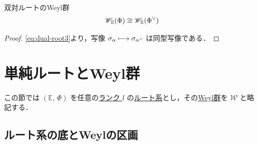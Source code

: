 \documentclass[rep_main]{subfiles}
\begin{document}
\begin{mylem}[label=lem:Weylgroup-dual]{双対ルートのWeyl群}
	\begin{align}
		\mathscr{W}_{\mathbb{E}}(\Phi) \cong \mathscr{W}_{\mathbb{E}}(\Phi^\vee)
	\end{align}
\end{mylem}

\begin{proof}
	\eqref{eq:dual-root3}より，写像 $\sigma_\alpha \longmapsto \sigma_{\alpha^\vee}$ は同型写像である．
\end{proof}


\section{単純ルートとWeyl群}

この節では $(\mathbb{E},\, \Phi)$ を任意の\hyperref[def:rank-root]{ランク $l$} の\hyperref[ax:root-system]{ルート系}とし，その\hyperref[def:Weylgroup]{Weyl群}を $\mathscr{W}$ と略記する． 

\subsection{ルート系の底とWeylの区画}
\end{document}

